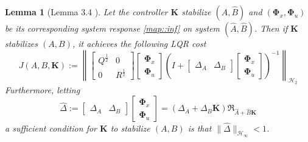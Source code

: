 \documentclass{article}[12pt]
\newtheorem{lemma}{Lemma}
\begin{document}
\begin{lemma}[Lemma 3.4 \cite{dean2017sample}]
\label{lem::LQR}
Let the controller $\mathbf{K}$ stabilize $(\hat{A},\hat{B})$ and $(\mathbf{\Phi}_{x}, \mathbf{\Phi}_u)$ be its corresponding system response \eqref{map::inf} on system $(\hat{A},\hat{B})$. 
Then if $\mathbf{K}$ stabilizes $(A,B)$, it achieves the following LQR cost
\begin{equation}
\label{JABK}
    J(A, B, \mathbf{K}):=\left\|\left[\begin{array}{cc}{Q^{\frac{1}{2}}} & {0} \\ {0} & {R^{\frac{1}{2}}}\end{array}\right]\left[\begin{array}{c}{\mathbf{\Phi}_{x}} \\ {\mathbf{\Phi}_{u}}\end{array}\right]\left(I+\left[\begin{array}{ll}{\Delta_{A}} & {\Delta_{B}}\end{array}\right]\left[\begin{array}{c}{\mathbf{\Phi}_{x}} \\ {\mathbf{\Phi}_{u}}\end{array}\right]\right)^{-1}\right\|_{\mathcal{H}_{2}}
\end{equation}
Furthermore, letting 
\begin{equation}
\label{hat_delta}
    \hat{\Delta}:=\left[\begin{array}{ll}{\Delta_{A}} & {\Delta_{B}}\end{array}\right]\left[\begin{array}{l}{\mathbf{\Phi}_{x}} \\ {\mathbf{\Phi}_{u}}\end{array}\right]=\left(\Delta_{A}+\Delta_{B} \mathbf{K}\right) \mathfrak{R}_{\widehat{A}+\widehat{B} \mathbf{K}}
\end{equation}
a sufficient condition for $\mathbf{K}$ to stabilize $(A,B)$ is that $\|\hat{\Delta}\|_{\mathcal{H}_{\infty}}<1$.
\end{lemma}
\end{document}
